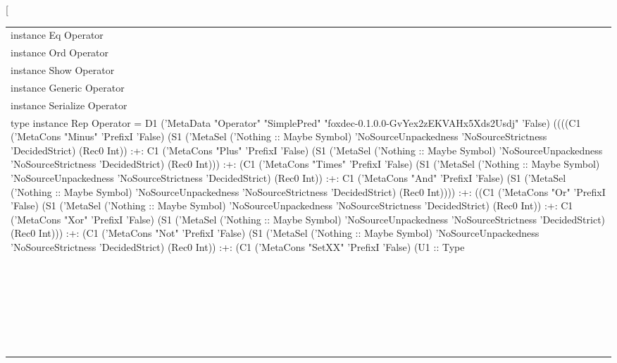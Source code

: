\begin{haddockdesc}
\item[\begin{tabular}{@{}l}
instance Eq Operator\\instance Ord Operator\\instance Show Operator\\instance Generic Operator\\instance Serialize Operator\\type instance Rep Operator = D1 ('MetaData "Operator" "SimplePred" "foxdec-0.1.0.0-GvYex2zEKVAHx5Xds2Usdj" 'False) ((((C1 ('MetaCons "Minus" 'PrefixI 'False) (S1 ('MetaSel ('Nothing :: Maybe Symbol) 'NoSourceUnpackedness 'NoSourceStrictness 'DecidedStrict) (Rec0 Int)) :+: C1 ('MetaCons "Plus" 'PrefixI 'False) (S1 ('MetaSel ('Nothing :: Maybe Symbol) 'NoSourceUnpackedness 'NoSourceStrictness 'DecidedStrict) (Rec0 Int))) :+: (C1 ('MetaCons "Times" 'PrefixI 'False) (S1 ('MetaSel ('Nothing :: Maybe Symbol) 'NoSourceUnpackedness 'NoSourceStrictness 'DecidedStrict) (Rec0 Int)) :+: C1 ('MetaCons "And" 'PrefixI 'False) (S1 ('MetaSel ('Nothing :: Maybe Symbol) 'NoSourceUnpackedness 'NoSourceStrictness 'DecidedStrict) (Rec0 Int)))) :+: ((C1 ('MetaCons "Or" 'PrefixI 'False) (S1 ('MetaSel ('Nothing :: Maybe Symbol) 'NoSourceUnpackedness 'NoSourceStrictness 'DecidedStrict) (Rec0 Int)) :+: C1 ('MetaCons "Xor" 'PrefixI 'False) (S1 ('MetaSel ('Nothing :: Maybe Symbol) 'NoSourceUnpackedness 'NoSourceStrictness 'DecidedStrict) (Rec0 Int))) :+: (C1 ('MetaCons "Not" 'PrefixI 'False) (S1 ('MetaSel ('Nothing :: Maybe Symbol) 'NoSourceUnpackedness 'NoSourceStrictness 'DecidedStrict) (Rec0 Int)) :+: (C1 ('MetaCons "SetXX" 'PrefixI 'False) (U1 :: Type\\\ \ \ \ \ \ \ \ \ \ \ \ \ \ \ \ \ \ \ \ \ \ \ \ \ \ \ \ \ \ \ \ \ \ \ \ \ \ \ \ \ \ \ \ \ \ \ \ \ \ \ \ \ \ \ \ \ \ \ \ \ \ \ \ \ \ \ \ \ \ \ \ \ \ \ \ \ \ \ \ \ \ \ \ \ \ \ \ \ \ \ \ \ \ \ \ \ \ \ \ \ \ \ \ \ \ \ \ \ \ \ \ \ \ \ \ \ \ \ \ \ \ \ \ \ \ \ \ \ \ \ \ \ \ \ \ \ \ \ \ \ \ \ \ \ \ \ \ \ \ \ \ \ \ \ \ \ \ \ \ \ \ \ \ \ \ \ \ \ \ \ \ \ \ \ \ \ \ \ \ \ \ \ \ \ \ \ \ \ \ \ \ \ \ \ \ \ \ \ \ \ \ \ \ \ \ \ \ \ \ \ \ \ \ \ \ \ \ \ \ \ \ \ \ \ \ \ \ \ \ \ \ \ \ \ \ \ \ \ \ \ \ \ \ \ \ \ \ \ \ \ \ \ \ \ \ \ \ \ \ \ \ \ \ \ \ \ \ \ \ \ \ \ \ \ \ \ \ \ \ \ \ \ \ \ \ \ \ \ \ \ \ \ \ \ \ \ \ \ \ \ \ \ \ \ \ \ \ \ \ \ \ \ \ \ \ \ \ \ \ \ \ \ \ \ \ \ \ \ \ \ \ \ \ \ \ \ \ \ \ \ \ \ \ \ \ \ \ \ \ \ \ \ \ \ \ \ \ \ \ \ \ \ \ \ \ \ \ \ \ \ \ \ \ \ \ \ \ \ \ \ \ \ \ \ \ \ \ \ \ \ \ \ \ \ \ \ \ \ \ \ \ \ \ \ \ \ \ \ \ \ \ \ \ \ \ \ \ \ \ \ \ \ \ \ \ \ \ \ \ \ \ \ \ \ \ \ \ \ \ \ \ \ \ \ \ \ \ \ \ \ \ \ \ \ \ \ \ \ \ \ \ \ \ \ \ \ \ \ \ \ \ \ \ \ \ \ \ \ \ \ \ \ \ \ \ \ \ \ \ \ \ \ \ \ \ \ \ \ \ \ \ \ \ \ \ \ \ \ \ \ \ \ \ \ \ \ \ \ \ \ \ \ \ \ \ \ \ \ \ \ \ \ \ \ \ \ \ \ \ \ \ \ \ \ \ \ \ \ \ \ \ \ \ \ \ \ \ \ \ \ \ \ \ \ \ \ \ \ \ \ \ \ \ \ \ \ \ \ \ \ \ \ \ \ \ \ \ \ \ \ \ \ \ \ \ \ \ \ \ \ \ \ \ \ \ \ \ \ \ \ \ \ \ \ \ \ \ \ \ \ \ \ \ \ \ \ \ \ \ \ \ \ \ \ \ \ \ \ \ \ \ \ \ \ \ \ \ \ \ \ \ \ \ \ \ \ \ \ \ \ \ \ \ \ \ \ \ \ \ \ \ \ \ \ \ \ \ \ \ \ \ \ \ \ \ \ \ \ \ \ \ \ \ \ \ \ \ \ \ \ \ \ \ \ \ \ \ \ \ \ \ \ \ \ \ \ \ \ \ \ \ \ \ \ \ \ \ \ \ \ \ \ \ \ \ \ \ \ \ \ \ \ \ \ \ \ \ \ \ \ \ \ \ \ \ \ \ 
\end{tabular}
\end{haddockdesc}
